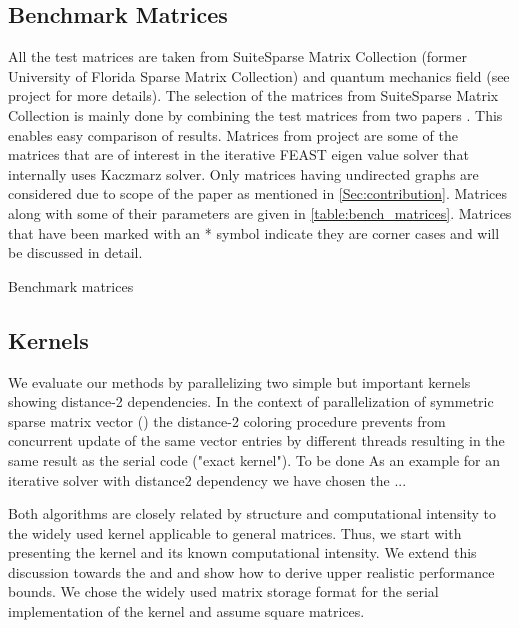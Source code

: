 \subsection{Benchmark Matrices}
All the test matrices are taken from SuiteSparse Matrix Collection (former University of Florida Sparse Matrix Collection) \cite{UOF} and quantum mechanics field (see \ESSEX project \cite{ESSEX} for more details). The selection of the matrices from SuiteSparse Matrix Collection is  mainly done by combining the test matrices from two papers \cite{RSB,park_ls}. This enables easy comparison of results. Matrices from \ESSEX project are some of the matrices that are of interest in the iterative FEAST eigen value solver that internally uses Kaczmarz solver.  Only matrices having undirected graphs are considered due to scope of the paper as mentioned in \cref{Sec:contribution}. Matrices along with some of their parameters are given in \cref{table:bench_matrices}.  Matrices that have been marked with an * symbol indicate they are corner cases and will be discussed in detail.

\begin{table}[ht]
	\footnotesize
	\caption{Benchmark matrices}\label{tab:test_mtx}
	\label{table:bench_matrices}
	\begin{center}
		
	\end{center}

\end{table}

\subsection{Kernels} \label{subsec:test_kernels}
We evaluate our methods by parallelizing two simple but important kernels showing distance-2 dependencies. In the context of parallelization of symmetric sparse matrix vector (\SymmSpmv) the distance-2 coloring procedure prevents from concurrent update of the same vector entries by different threads resulting in the same result as the serial code ("exact kernel").  {\GW To be done As an example for an iterative solver with distance2 dependency we have chosen the \KACZ ...}

Both algorithms are closely related by structure and computational intensity to the widely used \SpMV kernel applicable to general matrices. Thus, we start with presenting the \SpMV kernel and its known computational intensity. We extend this discussion towards the \SymmSpmv and \KACZ and show how to derive upper realistic performance bounds. We chose the widely used \CRS matrix storage format for the serial implementation of the kernel and assume square matrices.

